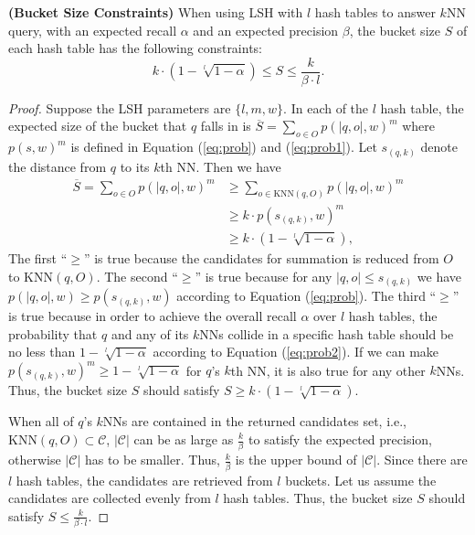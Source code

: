 \begin{prop}
\label{theorem:bucketsize}
\textbf{(Bucket Size Constraints)} When using LSH with $l$ hash tables to answer $k$NN query, with an expected recall $\alpha$ and an expected precision $\beta$, the bucket size $S$ of each hash table has the following constraints:
\begin{equation}\label{eq:bucketsize}
    k\cdot(1-\sqrt[l]{1-\alpha})\leq S\leq \frac{k}{\beta\cdot l}.
\end{equation}
\end{prop}
\begin{proof}
Suppose the LSH parameters are $\{l, m, w\}$. In each of the $l$ hash table, the expected size of the bucket that $q$ falls in is $\overline S=\sum_{o\in O}p(|q,o|,w)^{m}$ where $p(s, w)^m$ is defined in Equation (\ref{eq:prob}) and (\ref{eq:prob1}). Let $s_{(q,k)}$ denote the distance from $q$ to its $k$th NN. Then we have
\begin{equation}\label{eq:recall2}
\begin{aligned}
  \overline S=\sum_{o\in O}p(|q,o|,w)^{m}&\geq \sum_{o\in \text{KNN}(q,O)}p(|q,o|,w)^{m}\\
                                        &\geq k\cdot p(s_{(q,k)},w)^m\\
                                        &\geq k\cdot(1-\sqrt[l]{1-\alpha}),
\end{aligned}
\end{equation}
The first ``$\geq$'' is true because the candidates for summation is reduced from $O$ to $\text{KNN}(q,O)$. The second ``$\geq$'' is true because for any $|q,o|\leq s_{(q,k)}$ we have $p(|q,o|,w)\geq p(s_{(q,k)},w)$ according to Equation (\ref{eq:prob}). The third ``$\geq$'' is true because in order to achieve the overall recall $\alpha$ over $l$ hash tables, the probability that $q$ and any of its $k$NNs collide in a specific hash table should be no less than $1-\sqrt[l]{1-\alpha}$ according to Equation (\ref{eq:prob2}). If we can make $p(s_{(q,k)},w)^m\geq 1-\sqrt[l]{1-\alpha}$ for $q$'s $k$th NN, it is also true for any other $k$NNs. Thus, the bucket size $S$ should satisfy $S\geq k\cdot(1-\sqrt[l]{1-\alpha})$.

When all of $q$'s $k$NNs are contained in the returned candidates set, i.e., $\text{KNN}(q,O)\subset\mathcal{C}$, $|\mathcal{C}|$ can be as large as $\frac{k}{\beta}$ to satisfy the expected precision, otherwise $|\mathcal{C}|$ has to be smaller. Thus, $\frac{k}{\beta}$ is the upper bound of $|\mathcal{C}|$. Since there are $l$ hash tables, the candidates are retrieved from $l$ buckets. Let us assume the candidates are collected evenly from $l$ hash tables. Thus, the bucket size $S$ should satisfy $S\leq \frac{k}{\beta\cdot l}$.
\end{proof}

